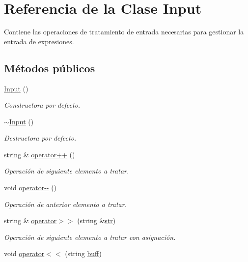 \hypertarget{class_input}{}\section{Referencia de la Clase Input}
\label{class_input}


Contiene las operaciones de tratamiento de entrada necesarias para gestionar la entrada de expresiones.  


\subsection*{Métodos públicos}
\begin{DoxyCompactItemize}
\item 
\hyperlink{class_input_abae3f379d3f157cf42dc857309832dba}{Input} ()
\begin{DoxyCompactList}\small\item\em Constructora por defecto. \end{DoxyCompactList}\item 
\hyperlink{class_input_af2db35ba67c8a8ccd23bef6a482fc291}{$\sim$\+Input} ()
\begin{DoxyCompactList}\small\item\em Destructora por defecto. \end{DoxyCompactList}\item 
string \& \hyperlink{class_input_ac07568c79da3730b3bbee03fc71a191f}{operator++} ()
\begin{DoxyCompactList}\small\item\em Operación de siguiente elemento a tratar. \end{DoxyCompactList}\item 
void \hyperlink{class_input_a90b48f4efc407d4434422fa46f279eef}{operator-\/-\/} ()
\begin{DoxyCompactList}\small\item\em Operación de anterior elemento a tratar. \end{DoxyCompactList}\item 
string \& \hyperlink{class_input_a7a84e2987975c9ea5c89d680f5f1d68e}{operator$>$$>$} (string \&\hyperlink{class_input_a0c2550eda9a6250028748d8870f4e83f}{str})
\begin{DoxyCompactList}\small\item\em Operación de siguiente elemento a tratar con asignación. \end{DoxyCompactList}\item 
void \hyperlink{class_input_a79630dc9ce45e346ae4b20a457c1b1b3}{operator$<$$<$} (string \hyperlink{class_input_a680019c05e47ad35677d5cb692978d98}{buff})

\end{DoxyCompactItemize}
